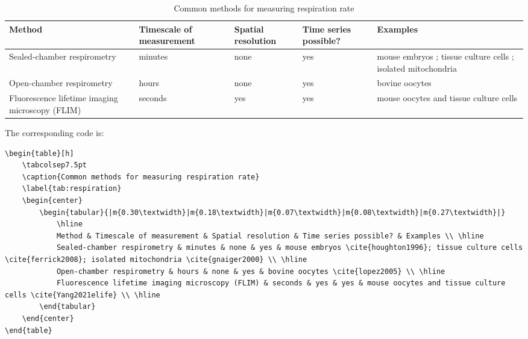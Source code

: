 \documentclass[11pt]{elegantbook}
\begin{document}
\begin{table}[h]
	\caption{Common methods for measuring respiration rate}
	\label{tab:respiration}
	\begin{center}
		\begin{tabular}{|m{}|m{}|m{}|m{}|m{}|}
			\hline
			Method & Timescale of measurement & Spatial resolution & Time series possible? & Examples \\ \hline
			Sealed-chamber respirometry & minutes & none & yes & mouse embryos \cite{houghton1996}; tissue culture cells \cite{ferrick2008}; isolated mitochondria \cite{gnaiger2000} \\ \hline
			Open-chamber respirometry & hours & none & yes & bovine oocytes \cite{lopez2005} \\ \hline
			Fluorescence lifetime imaging microscopy (FLIM) & seconds & yes & yes & mouse oocytes and tissue culture cells \cite{Yang2021elife} \\ \hline
		\end{tabular}
	\end{center}
\end{table}
The corresponding code is: 
\begin{lstlisting}
\begin{table}[h]
	\tabcolsep7.5pt
	\caption{Common methods for measuring respiration rate}
	\label{tab:respiration}
	\begin{center}
		\begin{tabular}{|m{0.30\textwidth}|m{0.18\textwidth}|m{0.07\textwidth}|m{0.08\textwidth}|m{0.27\textwidth}|}
			\hline
			Method & Timescale of measurement & Spatial resolution & Time series possible? & Examples \\ \hline
			Sealed-chamber respirometry & minutes & none & yes & mouse embryos \cite{houghton1996}; tissue culture cells \cite{ferrick2008}; isolated mitochondria \cite{gnaiger2000} \\ \hline
			Open-chamber respirometry & hours & none & yes & bovine oocytes \cite{lopez2005} \\ \hline
			Fluorescence lifetime imaging microscopy (FLIM) & seconds & yes & yes & mouse oocytes and tissue culture cells \cite{Yang2021elife} \\ \hline
		\end{tabular}
	\end{center}
\end{table}
\end{lstlisting}
\end{document}
